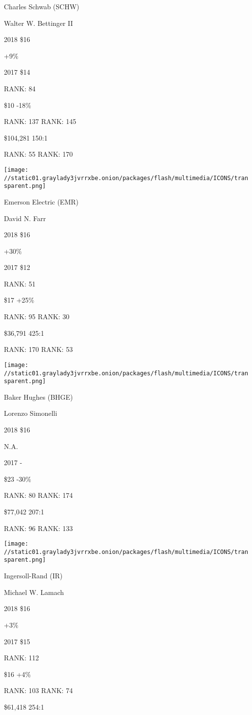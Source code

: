 Charles Schwab (SCHW)

Walter W. Bettinger II \protect\hyperlink{g-footnotes}{}

2018 \$16

 +9\%

2017 \$14

RANK: 84

 \$10 -18\%

RANK: 137 RANK: 145

 \$104,281 150:1

RANK: 55 RANK: 170

\texttt{[image: //static01.graylady3jvrrxbe.onion/packages/flash/multimedia/ICONS/transparent.png]}

Emerson Electric (EMR)

David N. Farr \protect\hyperlink{g-footnotes}{}

2018 \$16

 +30\%

2017 \$12

RANK: 51

 \$17 +25\%

RANK: 95 RANK: 30

 \$36,791 425:1

RANK: 170 RANK: 53

\texttt{[image: //static01.graylady3jvrrxbe.onion/packages/flash/multimedia/ICONS/transparent.png]}

Baker Hughes (BHGE)

Lorenzo Simonelli \protect\hyperlink{g-footnotes}{}

2018 \$16

 N.A.

2017 -

 \$23 -30\%

RANK: 80 RANK: 174

 \$77,042 207:1

RANK: 96 RANK: 133

\texttt{[image: //static01.graylady3jvrrxbe.onion/packages/flash/multimedia/ICONS/transparent.png]}

Ingersoll-Rand (IR)

Michael W. Lamach \protect\hyperlink{g-footnotes}{}

2018 \$16

 +3\%

2017 \$15

RANK: 112

 \$16 +4\%

RANK: 103 RANK: 74

 \$61,418 254:1

